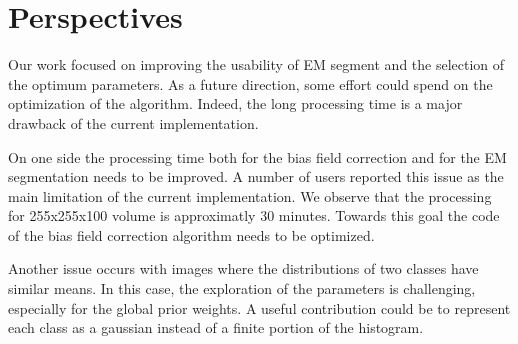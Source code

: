 %
%

%

\section{Perspectives}
Our work focused on improving the usability of EM segment and the selection of the optimum parameters. As a future direction, some effort could spend on the optimization of the algorithm. Indeed, the long processing time is a major drawback of the current implementation.
\par
On one side the processing time both for the bias field correction and for the EM segmentation needs to be improved. A number of users reported this issue as the main limitation of the current implementation. We observe that the processing for 255x255x100 volume is approximatly 30 minutes. Towards this goal the code of the bias field correction algorithm needs to be optimized.
\par
Another issue occurs with images where the distributions of two classes have similar means. In this case, the exploration of the parameters is challenging, especially for the global prior weights. A useful contribution could be to represent each class as a gaussian instead of a finite portion of the histogram.



